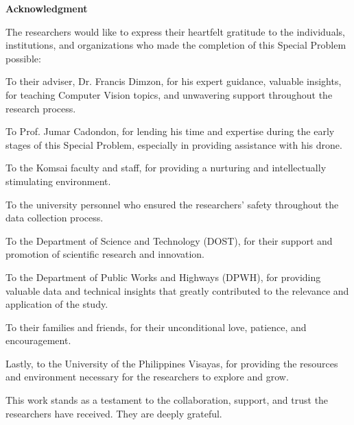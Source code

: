 \begin{center}
	\textbf{\Large Acknowledgment}
\end{center}

\vspace{2em}

The researchers would like to express their heartfelt gratitude to the individuals, institutions, and organizations who made the completion of this Special Problem possible:

To their adviser, Dr. Francis Dimzon, for his expert guidance, valuable insights, for teaching Computer Vision topics, and unwavering support throughout the research process.

To Prof. Jumar Cadondon, for lending his time and expertise during the early stages of this Special Problem, especially in providing assistance with his drone.

To the Komsai faculty and staff, for providing a nurturing and intellectually stimulating environment.

To the university personnel who ensured the researchers' safety throughout the data collection process.

To the Department of Science and Technology (DOST), for their support and promotion of scientific research and innovation.

To the Department of Public Works and Highways (DPWH), for providing valuable data and technical insights that greatly contributed to the relevance and application of the study.

To their families and friends, for their unconditional love, patience, and encouragement.

Lastly, to the University of the Philippines Visayas, for providing the resources and environment necessary for the researchers to explore and grow.

This work stands as a testament to the collaboration, support, and trust the researchers have received. They are deeply grateful.